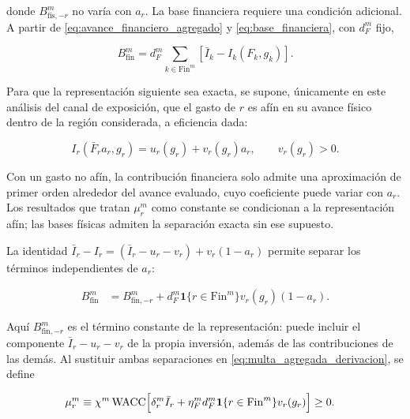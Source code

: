donde \(B_{\mathrm{fis},-r}^m\) no varía con \(a_r\). La base financiera requiere una condición adicional. A partir de \eqref{eq:avance_financiero_agregado} y \eqref{eq:base_financiera}, con \(d_F^m\) fijo,

\begin{equation}
B_{\mathrm{fin}}^m
=
d_F^m\sum_{k\in\mathrm{Fin}^m}
\left[\bar I_k-I_k(F_k,g_k)\right].
\end{equation}

Para que la representación siguiente sea exacta, se supone, únicamente en este análisis del canal de exposición, que el gasto de \(r\) es afín en su avance físico dentro de la región considerada, a eficiencia dada:

\begin{equation}
\label{eq:afinidad_gasto_exposicion}
I_r(\bar F_r a_r,g_r)
=
u_r(g_r)+v_r(g_r)a_r,
\qquad v_r(g_r)>0.
\end{equation}

Con un gasto no afín, la contribución financiera solo admite una aproximación de primer orden alrededor del avance evaluado, cuyo coeficiente puede variar con \(a_r\). Los resultados que tratan \(\mu_r^m\) como constante se condicionan a la representación afín; las bases físicas admiten la separación exacta sin ese supuesto.

La identidad \(\bar I_r-I_r=(\bar I_r-u_r-v_r)+v_r(1-a_r)\) permite separar los términos independientes de \(a_r\):

\begin{equation}
\label{eq:separacion_base_financiera_r}
\begin{aligned}
B_{\mathrm{fin}}^m
&=B_{\mathrm{fin},-r}^m+d_F^m\mathbf1\{r\in\mathrm{Fin}^m\}
v_r(g_r)(1-a_r).
\end{aligned}
\end{equation}

Aquí \(B_{\mathrm{fin},-r}^m\) es el término constante de la representación: puede incluir el componente \(\bar I_r-u_r-v_r\) de la propia inversión, además de las contribuciones de las demás. Al sustituir ambas separaciones en \eqref{eq:multa_agregada_derivacion}, se define

\begin{equation}
\label{eq:coeficiente_exposicion_derivado}
\begin{aligned}
\mu_r^m
&\equiv\chi^m\,\mathrm{WACC}
\Bigl[\delta_r^m\bar I_r+\eta_F^m d_F^m
\mathbf1\{r\in\mathrm{Fin}^m\}v_r(g_r)\Bigr]
\geq0.
\end{aligned}
\end{equation}

